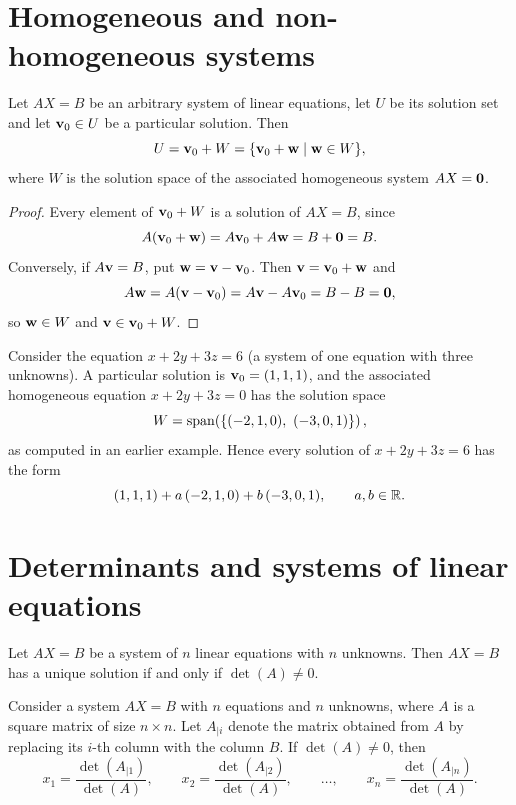 \section{Homogeneous and non-homogeneous systems}

\begin{theorem}
Let $AX=B$ be an arbitrary system of linear equations, let $U$ be its solution set and let $\mathbf{v}_0\in U$ be a
particular solution. Then
\[
U = \mathbf{v}_0 + W =\{\mathbf{v}_0 + \mathbf{w} \mid \mathbf{w}\in W\},
\]
where $W$ is the solution space of the associated homogeneous system $AX=\mathbf{0}$.
\end{theorem}

\begin{proof}
Every element of $\mathbf{v}_0 + W$ is a solution of $AX=B$, since
\[
A(\mathbf{v}_0 + \mathbf{w}) = A\mathbf{v}_0 + A\mathbf{w}=B+\mathbf{0}=B.
\]
Conversely, if $A\mathbf{v}=B$, put $\mathbf{w}=\mathbf{v}-\mathbf{v}_0$. Then $\mathbf{v} = \mathbf{v}_0+\mathbf{w}$ and
\[
A\mathbf{w} = A(\mathbf{v}-\mathbf{v}_0) = A\mathbf{v}-A\mathbf{v}_0 = B-B = \mathbf{0},
\]
so $\mathbf{w}\in W$ and $\mathbf{v}\in \mathbf{v}_0+W$.
\end{proof}

\begin{example}
Consider the equation $x+2y+3z = 6$ (a system of one equation with three unknowns). A particular solution
is $\mathbf{v}_0 = (1,1,1)$, and the associated homogeneous equation $x+2y+3z = 0$ has the solution space
\[
W = \operatorname{span}\!\left(\{(-2,1,0),\ (-3,0,1)\}\right),
\]
as computed in an earlier example. Hence every solution of $x+2y+3z=6$ has the form
\[
(1,1,1) + a\,(-2,1,0)+b\,(-3,0,1), \qquad a,b\in\mathbb{R}.
\]
\end{example}

\section{Determinants and systems of linear equations}

\begin{theorem}
Let $AX=B$ be a system of $n$ linear equations with $n$ unknowns. Then $AX=B$ has a unique solution if and
only if $\det(A)\neq 0$.
\end{theorem}

\begin{theorem}
Consider a system $AX=B$ with $n$ equations and $n$ unknowns, where $A$ is a square matrix of size
$n\times n$. Let $A_{|i}$ denote the matrix obtained from $A$ by replacing its $i$-th column with the column
$B$. If $\det(A)\neq 0$, then
\[
x_1 = \frac{\det(A_{|1})}{\det(A)}, \qquad
x_2 = \frac{\det(A_{|2})}{\det(A)}, \qquad
\ldots, \qquad
x_n = \frac{\det(A_{|n})}{\det(A)}.
\]
\end{theorem}

